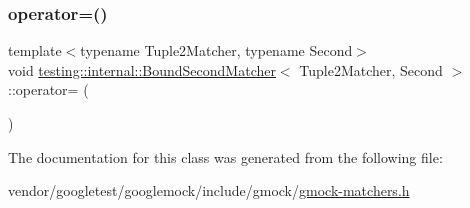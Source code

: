 \mbox{\label{classtesting_1_1internal_1_1_bound_second_matcher_a62f714cb2c7388cb582aaae0110bfe49}} 
\subsubsection{\texorpdfstring{operator=()}{operator=()}}
{\footnotesize\ttfamily template$<$typename Tuple2\+Matcher, typename Second$>$ \\
void \hyperlink{classtesting_1_1internal_1_1_bound_second_matcher}{testing\+::internal\+::\+Bound\+Second\+Matcher}$<$ Tuple2\+Matcher, Second $>$\+::operator= (\begin{DoxyParamCaption}\item[{const \hyperlink{classtesting_1_1internal_1_1_bound_second_matcher}{Bound\+Second\+Matcher}$<$ Tuple2\+Matcher, Second $>$ \&}]{ }\end{DoxyParamCaption})\hspace{0.3cm}{\ttfamily [inline]}}



The documentation for this class was generated from the following file\+:\begin{DoxyCompactItemize}
\item 
vendor/googletest/googlemock/include/gmock/\hyperlink{gmock-matchers_8h}{gmock-\/matchers.\+h}\end{DoxyCompactItemize}
